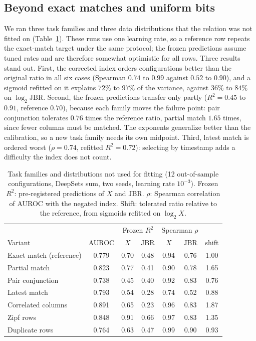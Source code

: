 \documentclass[conference]{IEEEtran}
\newcommand{\jbr}{\mathrm{JBR}}
\begin{document}
\subsection{Beyond exact matches and uniform bits}
\label{sec:beyond}

We ran three task families and three data distributions that the relation was not fitted on (Table~\ref{tab:beyond}). These runs use one learning rate, so a reference row repeats the exact-match target under the same protocol; the frozen predictions assume tuned rates and are therefore somewhat optimistic for all rows. Three results stand out. First, the corrected index orders configurations better than the original ratio in all six cases (Spearman $0.74$ to $0.99$ against $0.52$ to $0.90$), and a sigmoid refitted on it explains $72\%$ to $97\%$ of the variance, against $36\%$ to $84\%$ on $\log_2\jbr$. Second, the frozen predictions transfer only partly ($R^2 = 0.45$ to $0.91$, reference $0.70$), because each family moves the failure point: pair conjunction tolerates $0.76$ times the reference ratio, partial match $1.65$ times, since fewer columns must be matched. The exponents generalize better than the calibration, so a new task family needs its own midpoint. Third, latest match is ordered worst ($\rho = 0.74$, refitted $R^2 = 0.72$): selecting by timestamp adds a difficulty the index does not count.

\begin{table}[t]
\caption{Task families and distributions not used for fitting (12 out-of-sample configurations, DeepSets sum, two seeds, learning rate $10^{-3}$). Frozen $R^2$: pre-registered predictions of $X$ and $\jbr$. $\rho$: Spearman correlation of AUROC with the negated index. Shift: tolerated ratio relative to the reference, from sigmoids refitted on $\log_2 X$.}
\label{tab:beyond}
\centering
\setlength{\tabcolsep}{3pt}
\begin{tabular}{lcccccc}
\toprule
& & \multicolumn{2}{c}{Frozen $R^2$} & \multicolumn{2}{c}{Spearman $\rho$} & \\
Variant & AUROC & $X$ & $\jbr$ & $X$ & $\jbr$ & shift\\
\midrule
Exact match (reference) & 0.779 & 0.70 & 0.48 & 0.94 & 0.76 & 1.00\\
\midrule
Partial match & 0.823 & 0.77 & 0.41 & 0.90 & 0.78 & 1.65\\
Pair conjunction & 0.738 & 0.45 & 0.40 & 0.92 & 0.83 & 0.76\\
Latest match & 0.793 & 0.54 & 0.28 & 0.74 & 0.52 & 0.88\\
\midrule
Correlated columns & 0.891 & 0.65 & 0.23 & 0.96 & 0.83 & 1.87\\
Zipf rows & 0.848 & 0.91 & 0.66 & 0.97 & 0.83 & 1.35\\
Duplicate rows & 0.764 & 0.63 & 0.47 & 0.99 & 0.90 & 0.93\\
\bottomrule
\end{tabular}
\end{table}
\end{document}
